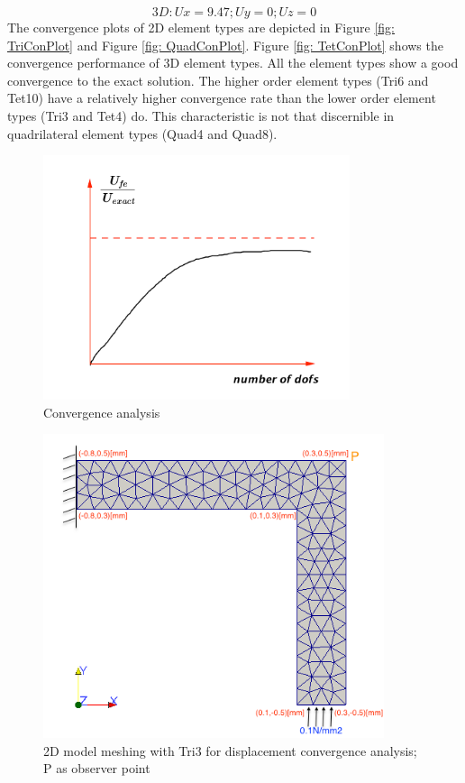 \begin{equation*}
3D: Ux = 9.47; Uy = 0; Uz = 0
\end{equation*}
The convergence plots of 2D element types are depicted in Figure \ref{fig: TriConPlot} and Figure \ref{fig: QuadConPlot}. Figure \ref{fig: TetConPlot} shows the convergence performance of 3D element types. All the element types show a good convergence to the exact solution. The higher order element types (Tri6 and Tet10) have a relatively higher convergence rate than the lower order element types (Tri3 and Tet4) do. This characteristic is not that discernible in quadrilateral element types (Quad4 and Quad8). 

\begin{figure}[htbp]
	\begin{center}	
		\includegraphics[width=9cm,clip]{convergence.pdf} 			
		\caption{Convergence analysis} \label{fig: convergence}
	\end{center}
\end{figure}


\begin{figure}[htbp]
	\begin{center}	
		\includegraphics[width=10cm,clip]{Convergence2D.png} 			
		\caption{2D model meshing with Tri3 for displacement convergence analysis; P as observer point} \label{fig: Convergence2D}
	\end{center}
\end{figure}


